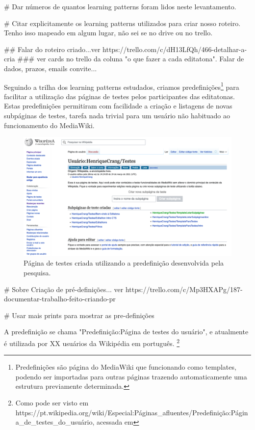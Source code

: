# Dar números de quantos learning patterns foram lidos neste levantamento.

# Citar explicitamente os learning patterns utilizados para criar nosso roteiro. Tenho isso mapeado em algum lugar, não sei se no drive ou no trello.


## Falar do roteiro criado...ver https://trello.com/c/dH13LfQh/466-detalhar-a-cria%
### ver cards no trello da coluna "o que fazer a cada editatona". Falar de dados, prazos, emails convite...

Seguindo a trilha dos learning patterns estudados, criamos predefinições\footnote{Predefinições são página do MediaWiki que funcionando como templates, podendo ser importadas para outras páginas trazendo automaticamente uma estrutura previamente determinada.} para facilitar a utilização das páginas de testes pelos participantes das editatonas. Estas predefinições permitiram com facilidade a criação e listagens de novas subpáginas de testes, tarefa nada trivial para um usuário não habituado ao funcionamento do MediaWiki.

\begin{figure}[H]
    \centering
    \includegraphics[width=1\textwidth]{Images/pagina_de_Testes.png}
    \caption{Página de testes criada utilizando a predefinição desenvolvida pela pesquisa.}
    \label{fig:pagina_de_testes_editatona}
\end{figure}


# Sobre Criação de pré-definições... ver https://trello.com/c/Mp3HXAPg/187-documentar-trabalho-feito-criando-pr%

# Usar mais prints para mostrar as pre-definições


A predefinição se chama "Predefinição:Página de testes do usuário", e atualmente é utilizada por XX usuários da Wikipédia em português. \footnote{Como pode ser visto em https://pt.wikipedia.org/wiki/Especial:Páginas_afluentes/Predefinição:Página_de_testes_do_usuário, acessada em }



